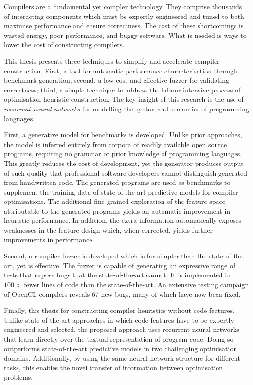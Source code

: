 Compilers are a fundamental yet complex technology. They comprise thousands of interacting components which must be expertly engineered and tuned to both maximise performance and ensure correctness.  The cost of these shortcomings is wasted energy, poor performance, and buggy software. What is needed is ways to lower the cost of constructing compilers.

This thesis presents three techniques to simplify and accelerate compiler construction. First, a tool for automatic performance characterisation through benchmark generation; second, a low-cost and effective fuzzer for validating correctness; third, a simple technique to address the labour intensive process of optimisation heuristic construction. The key insight of this research is the use of \emph{recurrent neural networks} for modelling the syntax and semantics of programming languages.

First, a generative model for benchmarks is developed. Unlike prior approaches, the model is inferred entirely from corpora of readily available open source programs, requiring no grammar or prior knowledge of programming languages. This greatly reduces the cost of development, yet the generator produces output of such quality that professional software developers cannot distinguish generated from handwritten code. The generated programs are used as benchmarks to supplement the training data of state-of-the-art predictive models for compiler optimisations. The additional fine-grained exploration of the feature space attributable to the generated programs yields an automatic improvement in heuristic performance. In addition, the extra information automatically exposes weaknesses in the feature design which, when corrected, yields further improvements in performance.

Second,  a compiler fuzzer is developed which is far simpler than the state-of-the-art, yet is effective. The fuzzer is capable of generating an expressive range of tests that expose bugs that the state-of-the-art cannot. It is implemented in $100\times$ fewer lines of code than the state-of-the-art. An extensive testing campaign of OpenCL compilers reveals 67 new bugs, many of which have now been fixed.

Finally, this thesis  for constructing compiler heuristics without code features. Unlike state-of-the-art approaches in which code features have to be expertly engineered and selected, the proposed approach uses recurrent neural networks that learn directly over the textual representation of program code. Doing so outperforms state-of-the-art predictive models in two challenging optimisation domains. Additionally, by using the same neural network structure for different tasks, this enables the novel transfer of information between optimisation problems.
